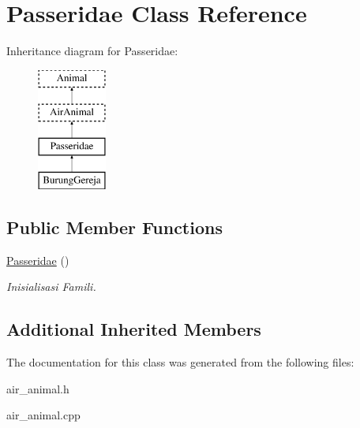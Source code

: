\hypertarget{class_passeridae}{}\section{Passeridae Class Reference}
\label{class_passeridae}
Inheritance diagram for Passeridae\+:\begin{figure}[H]
\begin{center}
\leavevmode
\includegraphics[height=4.000000cm]{class_passeridae}
\end{center}
\end{figure}
\subsection*{Public Member Functions}
\begin{DoxyCompactItemize}
\item 
\hyperlink{class_passeridae_aa24fb287c24f4516139b0447edd4a1b5}{Passeridae} ()\hypertarget{class_passeridae_aa24fb287c24f4516139b0447edd4a1b5}{}\label{class_passeridae_aa24fb287c24f4516139b0447edd4a1b5}

\begin{DoxyCompactList}\small\item\em Inisialisasi Famili. \end{DoxyCompactList}\end{DoxyCompactItemize}
\subsection*{Additional Inherited Members}


The documentation for this class was generated from the following files\+:\begin{DoxyCompactItemize}
\item 
air\+\_\+animal.\+h\item 
air\+\_\+animal.\+cpp\end{DoxyCompactItemize}
